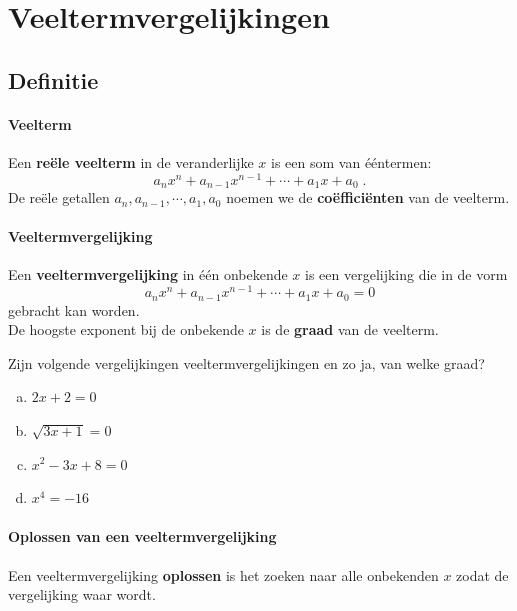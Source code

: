 \documentclass[12pt]{article}
\begin{document}
\fancyhead[RE,LO]{}

\onehalfspacing

\section{Veeltermvergelijkingen}

\subsection{Definitie}

\paragraph{Veelterm}
\begin{mdframed}
  Een {\bf reële veelterm} in de veranderlijke $x$ is een som van ééntermen:
  $$ a_nx^n + a_{n-1}x^{n-1} + \cdots + a_1x + a_0 \;.$$
  De reële getallen $a_n, a_{n-1}, \cdots, a_1, a_0$ noemen we de {\bf coëfficiënten} van de veelterm.
\end{mdframed}

\paragraph{Veeltermvergelijking}
\begin{mdframed}
  Een {\bf veeltermvergelijking} in één onbekende $x$ is een vergelijking die in de vorm
  $$a_nx^n + a_{n-1}x^{n-1} + \cdots + a_1x + a_0 = 0$$
  gebracht kan worden.\\
  De hoogste exponent bij de onbekende $x$ is de {\bf graad} van de veelterm.
\end{mdframed}

\begin{oefening}
  Zijn volgende vergelijkingen veeltermvergelijkingen en zo ja, van welke graad?
  \begin{multicols}{2}
    \begin{enumerate}[(a)]
    \item $2x + 2 = 0$
    \item $\sqrt{3x+1} = 0$
    \item $x^2-3x+8=0$
    \item $x^4=-16$
    \end{enumerate}
  \end{multicols}
\end{oefening}

\paragraph{Oplossen van een veeltermvergelijking}
\begin{mdframed}
  Een veeltermvergelijking {\bf oplossen} is het zoeken naar alle onbekenden $x$ zodat de vergelijking waar wordt.
\end{mdframed}
\end{document}

